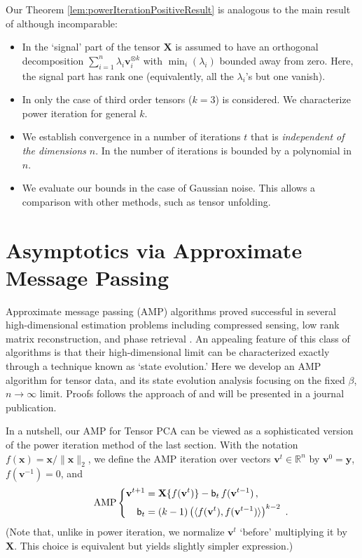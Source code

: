 \documentclass[11pt]{article}
\theoremstyle{definition}
\def\<{\langle}
\def\>{\rangle}
\def\reals{\mathbb{R}}
\def\bx{\mathbf{x}}
\def\bv{\mathbf{v}}
\def\bX{\mathbf{X}}
\def\ons{{\sf b}}
\def\by{{\mathbf y}}
\begin{document}
Our Theorem \ref{lem:powerIterationPositiveResult} is analogous
to the main result of \cite{anandkumar12} although incomparable:
%
\begin{itemize}
\item In \cite{anandkumar12} the `signal' part of the tensor $\bX$ is
assumed to have an orthogonal decomposition $\sum_{i=1}^n \lambda_i
\bv_i^{\otimes k}$ with $\min_i(\lambda_i)$ bounded away from zero.
Here, the signal part has rank one (equivalently, all the
$\lambda_i$'s but one vanish).
%
\item In   \cite{anandkumar12} only the case of third order tensors
  ($k=3$) is considered. We characterize power iteration for general $k$.
%
\item We establish convergence in a number of iterations $t$ that is
  \emph{independent of the dimensions} $n$. In   \cite{anandkumar12}
the number of iterations is bounded by a polynomial in $n$.
%
\item  We evaluate our bounds in the case of Gaussian noise. This
  allows a comparison with other methods, such as tensor unfolding.
\end{itemize}

\section{Asymptotics via Approximate Message Passing }\label{sec:AMP}

Approximate message passing (AMP) algorithms \cite{DMM09,BM-MPCS-2011} proved successful in
several high-dimensional estimation problems including compressed
sensing, low rank matrix reconstruction, and phase retrieval
\cite{fletcher2011neural,kamilov2012approximate,schniter2011approximate,schniter2012compressive}.
An appealing feature of this class of algorithms is that their
high-dimensional limit can be characterized exactly through a
technique known as `state evolution.'
Here we develop an AMP algorithm for tensor data, and its state
evolution analysis focusing on the fixed $\beta$,
$n\to\infty$ limit. Proofs follows the approach of \cite{BM-MPCS-2011}
and will be presented in a journal publication.

In a nutshell, our AMP for Tensor PCA can be viewed as a sophisticated
version  of the power iteration method of the last section.
 With
the notation
$f(\bx) = \bx / \|\bx\|_2$, we define the AMP iteration over vectors
$\bv^t \in \reals^n$ by $\bv^0 = \by$, 
$f(\bv^{-1}) = 0$, and
%
\begin{align}\tag*{AMP}\label{eq:AMP}
%
\left \{  \begin{aligned}\bv^{t+1}  & = \bX \{ f(\bv^t)\}   -\ons_t\,f(\bv^{t-1})\, ,\\
\ons_t &= (k-1) \left (  \< f(\bv^t ), f(\bv^{t-1})\>\right
)^{k-2}~. \end{aligned} \right .
%
\end{align}
%
(Note that, unlike in power iteration, we normalize $\bv^t$ `before'
multiplying it by $\bX$. This choice is equivalent but yields slightly
simpler expression.)
\end{document}
